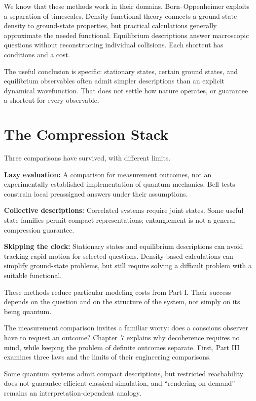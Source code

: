 We know that these methods work in their domains. Born--Oppenheimer exploits a separation of timescales. Density functional theory connects a ground-state density to ground-state properties, but practical calculations generally approximate the needed functional. Equilibrium descriptions answer macroscopic questions without reconstructing individual collisions. Each shortcut has conditions and a cost.

The useful conclusion is specific: stationary states, certain ground states, and equilibrium observables often admit simpler descriptions than an explicit dynamical wavefunction. That does not settle how nature operates, or guarantee a shortcut for every observable.

\section{The Compression Stack}

Three comparisons have survived, with different limits.

\textbf{Lazy evaluation:} A comparison for measurement outcomes, not an experimentally established implementation of quantum mechanics. Bell tests constrain local preassigned answers under their assumptions.

\textbf{Collective descriptions:} Correlated systems require joint states. Some useful state families permit compact representations; entanglement is not a general compression guarantee.

\textbf{Skipping the clock:} Stationary states and equilibrium descriptions can avoid tracking rapid motion for selected questions. Density-based calculations can simplify ground-state problems, but still require solving a difficult problem with a suitable functional.

These methods reduce particular modeling costs from Part I. Their success depends on the question and on the structure of the system, not simply on its being quantum.

The measurement comparison invites a familiar worry: does a conscious observer have to request an outcome? Chapter~7 explains why decoherence requires no mind, while keeping the problem of definite outcomes separate. First, Part III examines three laws and the limits of their engineering comparisons.

\begin{keytakeawaybox}
Some quantum systems admit compact descriptions, but restricted reachability does not guarantee efficient classical simulation, and ``rendering on demand'' remains an interpretation-dependent analogy.
\end{keytakeawaybox}
